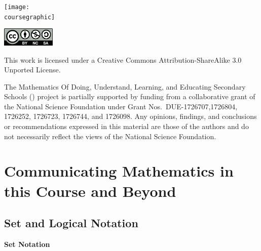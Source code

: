 \documentclass[11pt]{article}
\theoremstyle{definition}
\begin{document}
\maketitle
\ifthenelse{\equal{\coursegraphic}{}} %
	{}
	{\begin{center}\texttt{[image: \\coursegraphic]}\end{center}}
	
\vfill 
\begin{center} \includegraphics[width=1in]{by-nc-sa.png} \end{center}
\footnotesize{ This work is licensed under a Creative Commons Attribution-ShareAlike 3.0 Unported License. }

\footnotesize{
The Mathematics Of Doing, Understand, Learning, and Educating Secondary Schools (\MODULES) project is partially supported by funding from a collaborative grant of the National Science Foundation under Grant Nos.~DUE-1726707,1726804, 1726252, 1726723, 1726744, and 1726098.  Any opinions, findings, and conclusions or recommendations expressed in this material are those of the authors and do not necessarily reflect the views of the National Science Foundation.}
\newpage
\thispagestyle{plain}   
\listoftodos
\tableofcontents
\newpage {}

\setcounter{section}{-1}

\section{Communicating Mathematics in this Course and Beyond}\label{section: communicating mathematics}

	
\subsection{Set and Logical Notation}


{\bf Set Notation}
\end{document}
